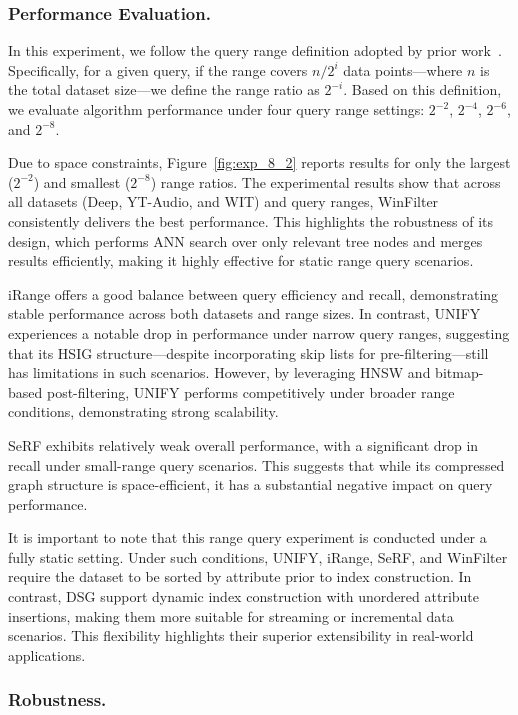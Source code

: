 \documentclass[sigconf, nonacm]{acmart}
\begin{document}
\begin{sloppypar}
\subsubsection{Performance Evaluation. }



In this experiment, we follow the query range definition adopted by prior work~\cite{HQI}. Specifically, for a given query, if the range covers $n/2^i$ data points—where $n$ is the total dataset size—we define the range ratio as $2^{-i}$. Based on this definition, we evaluate algorithm performance under four query range settings: $2^{-2}$, $2^{-4}$, $2^{-6}$, and $2^{-8}$.

Due to space constraints, Figure~\ref{fig:exp_8_2} reports results for only the largest ($2^{-2}$) and smallest ($2^{-8}$) range ratios. The experimental results show that across all datasets (Deep, YT-Audio, and WIT) and query ranges, WinFilter consistently delivers the best performance. This highlights the robustness of its design, which performs ANN search over only relevant tree nodes and merges results efficiently, making it highly effective for static range query scenarios.

iRange offers a good balance between query efficiency and recall, demonstrating stable performance across both datasets and range sizes. In contrast, UNIFY experiences a notable drop in performance under narrow query ranges, suggesting that its HSIG structure—despite incorporating skip lists for pre-filtering—still has limitations in such scenarios. However, by leveraging HNSW and bitmap-based post-filtering, UNIFY performs competitively under broader range conditions, demonstrating strong scalability.

SeRF exhibits relatively weak overall performance, with a significant drop in recall under small-range query scenarios. This suggests that while its compressed graph structure is space-efficient, it has a substantial negative impact on query performance.

It is important to note that this range query experiment is conducted under a fully static setting. Under such conditions, UNIFY, iRange, SeRF, and WinFilter require the dataset to be sorted by attribute prior to index construction. In contrast, DSG  support dynamic index construction with unordered attribute insertions, making them more suitable for streaming or incremental data scenarios. This flexibility highlights their superior extensibility in real-world applications.
\subsubsection{Robustness.}



\end{sloppypar}
\end{document}
